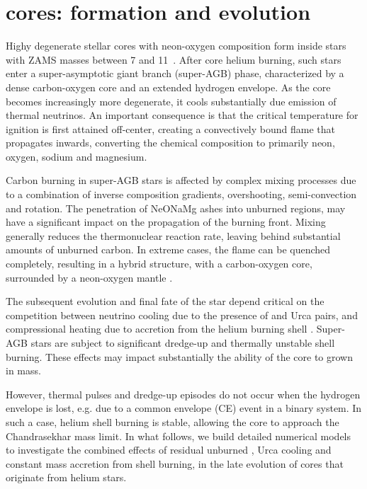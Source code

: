 \documentclass[twocolumn,tighten,times]{aastex62}
\begin{document}
\section{\one cores: formation and evolution}\label{sec:2}
Highy degenerate stellar cores with neon-oxygen composition form inside stars with ZAMS masses  
between  7 and 11\msun\ \citep{Farmer:2015afs,Woosley:2019sdf}. 
After core helium burning, such stars enter a super-asymptotic giant branch 
(super-AGB) phase, characterized by a dense carbon-oxygen 
core and an  extended hydrogen envelope.  
As the core becomes increasingly more degenerate, it cools substantially 
due emission of thermal neutrinos. An important consequence is that the critical 
temperature for  ignition is first attained off-center, creating a 
convectively bound  flame that propagates inwards, 
converting the chemical composition 
to primarily neon, oxygen, sodium and magnesium.  

Carbon burning in super-AGB stars is affected by complex mixing processes 
due to a combination of inverse composition gradients, overshooting, 
semi-convection and rotation. The penetration of 
NeONaMg ashes into unburned regions, may have a significant impact on the propagation of
the burning front. Mixing generally reduces the thermonuclear reaction rate, leaving 
behind substantial amounts of unburned carbon. In extreme cases, the flame can be 
quenched completely, resulting in a hybrid structure,  with a carbon-oxygen core, 
surrounded by a neon-oxygen mantle \citep{Denissenkov:2013qaa}. 

The subsequent evolution and final fate of the star depend  critical on the competition 
between neutrino cooling due to the presence of  and 
 Urca pairs, and compressional heating due to accretion from the helium burning shell \citep{Schwab:2017epw}. 
Super-AGB stars are subject to significant dredge-up  and 
thermally unstable shell burning. 
These effects may impact substantially the ability of the core to grown in mass. 

However, thermal pulses and dredge-up episodes do not 
occur when the hydrogen envelope 
is lost, e.g. due to a common envelope (CE) event in a binary system.  
In such a case, helium shell burning is stable, allowing  
the core to approach the Chandrasekhar mass limit. 
In what follows, we build detailed numerical models to 
investigate the combined effects 
of residual unburned , Urca cooling and constant mass accretion from shell 
burning, in the late evolution of \one cores that originate from helium stars. 
\end{document}
